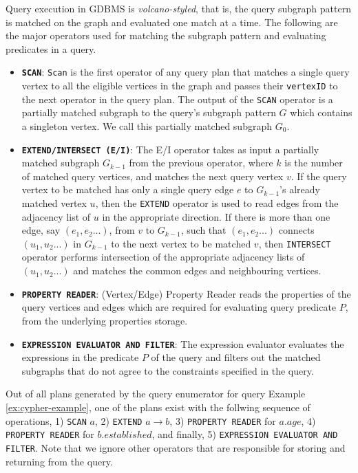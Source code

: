 Query execution in GDBMS is \emph{volcano-styled}, that is, the query subgraph pattern is matched on the graph and evaluated one match at a time. The following are the major operators used for matching the subgraph pattern and evaluating predicates in a query.
\begin{itemize}
	
	\item \textbf{\texttt{SCAN}}: \texttt{Scan} is the first operator of any query plan that matches a single query vertex to all the eligible vertices in the graph and passes their \texttt{vertexID} to the next operator in the query plan. The output of the \texttt{SCAN} operator is a partially matched subgraph to the query's subgraph pattern $G$ which contains a singleton vertex. We call this partially matched subgraph $G_0$.
	
	\item \textbf{\texttt{EXTEND/INTERSECT (E/I)}}: The E/I operator takes as input a partially matched subgraph $G_{k-1}$ from the previous operator, where $k$ is the number of matched query vertices, and matches the next query vertex $v$. If the query vertex to be matched has only a single query edge $e$ to $G_{k-1}$'s already matched vertex $u$, then the \texttt{EXTEND} operator is used to read edges from the adjacency list of $u$ in the appropriate direction. If there is more than one edge, say $(e_1, e_2 ...)$, from $v$ to $G_{k-1}$, such that $(e_1, e_2 ...)$ connects $(u_1, u_2 ...)$ in $G_{k-1}$ to the next vertex to be matched $v$, then \texttt{INTERSECT} operator performs intersection of the appropriate adjacency lists of $(u_1, u_2 ...)$ and matches the common edges and neighbouring vertices.
	
	\item \textbf{\texttt{PROPERTY READER}}: (Vertex/Edge) Property Reader reads the properties of the query vertices and edges which are required for evaluating query predicate $P$, from the underlying properties storage. 
	
	\item \textbf{\texttt{EXPRESSION EVALUATOR AND FILTER}}: The expression evaluator evaluates the expressions in the predicate $P$ of the query and filters out the matched subgraphs that do not agree to the constraints specified in the query.
	
\end{itemize}

Out of all plans generated by the query enumerator for query Example \ref{ex:cypher-example}, one of the plans exist with the follwing sequence of operations, 1) \texttt{SCAN} $a$, 2) \texttt{EXTEND} $a{\rightarrow}b$, 3) \texttt{PROPERTY READER} for $a.age$, 4) \texttt{PROPERTY READER} for $b.established$, and finally, 5) \texttt{EXPRESSION EVALUATOR AND FILTER}. Note that we ignore other operators that are responsible for storing and returning from the query.

